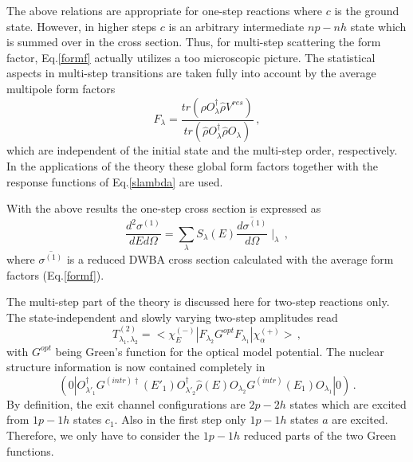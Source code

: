 \documentclass[twocolumn,amsmath,amssymb,10pt,groupedaddress,a4paper]{revtex4}
\begin{document}
The above relations are appropriate for one-step reactions where $c$
is the ground state. However, in higher steps $c$ is an arbitrary
intermediate $np-nh$ state which is summed over in the cross section.
Thus, for multi-step scattering the form factor, Eq.\ref{formf} actually
utilizes a too microscopic picture. The statistical aspects in multi-step
transitions are taken fully into account by the average multipole
form factors
\begin{equation}
F_{\lambda}=\frac{tr(\hat{\rho}O_{\lambda}^{\dag}\hat{\rho}V^{res})}{tr(\hat{\rho}O_{\lambda}^{\dag}\hat{\rho}O_{\lambda})}\,,\label{fav}
\end{equation}
\noindent which are independent of the initial state and the multi-step order,
respectively. In the applications of the theory these global form
factors together with the response functions of Eq.\ref{slambda}
are used.

With the above results the one-step cross section is expressed as
\begin{equation}
\frac{d^{2}\sigma^{(1)}}{dEd\Omega}=\sum_{\lambda}{S_{\lambda}(E)\overline{\frac{d\sigma^{(1)}}{d\Omega}}\mid_{\lambda}}\,,\label{sigma1}
\end{equation}
\noindent where $\overline{\sigma^{(1)}}$ is a reduced DWBA cross
section calculated with the average form factors (Eq.\ref{formf}).

The multi-step part of the theory is discussed here for two-step reactions
only. The state-independent and slowly varying two-step amplitudes
read
\begin{equation}
T_{\lambda_{1},\lambda_{2}}^{(2)}=<\chi_{E}^{(-)}|F_{\lambda_{2}}G^{opt}F_{\lambda_{1}}|\chi_{\alpha}^{(+)}>\,,\label{amp2}
\end{equation}
\noindent with $G^{opt}$ being Green's function for the optical model potential.
The nuclear structure information is now contained completely in
\begin{equation}
(0|O_{\lambda'_{1}}^{\dag}G^{(intr)\dag}(E'_{1})O_{\lambda'_{2}}^{\dag}\hat{\rho}(E)O_{\lambda_{2}}G^{(intr)}(E_{1})O_{\lambda_{1}}|0)\,.\label{two1}
\end{equation}
\noindent By definition, the exit channel configurations are $2p-2h$ states
which are excited from $1p-1h$ states $c_{1}$. Also in the first
step only $1p-1h$ states $a$ are excited. Therefore, we only have
to consider the $1p-1h$ reduced parts of the two Green functions.
\end{document}
